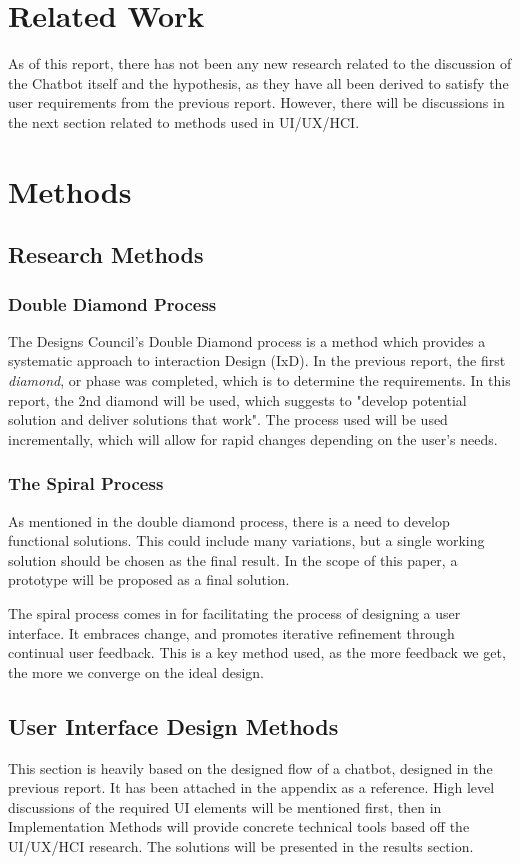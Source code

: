 \documentclass[conference]{IEEEtran}
\begin{document}
\section{Related Work}
As of this report, there has not been any new research related to the discussion of the Chatbot itself and the hypothesis, as they have all been derived to satisfy the user requirements from the previous report. However, there will be discussions in the next section related to methods used in UI/UX/HCI.
\section{Methods}
\subsection{Research Methods}
\subsubsection{Double Diamond Process}
The Designs Council’s Double Diamond process is a method which provides a systematic approach to interaction Design (IxD). In the previous report, the first \textit{diamond}, or phase was completed, which is to determine the requirements. In this report, the 2nd diamond will be used, which suggests to "develop potential solution and deliver solutions that work". The process used will be used incrementally, which will allow for rapid changes depending on the user's needs.
\subsubsection{The Spiral Process}
As mentioned in the double diamond process, there is a need to develop functional solutions. This could include many variations, but a single working solution should be chosen as the final result. In the scope of this paper, a prototype will be proposed as a final solution. 

The spiral process comes in for facilitating the process of designing a user interface. It embraces change, and promotes iterative refinement through continual user feedback. This is a key method used, as the more feedback we get, the more we converge on the ideal design.
\subsection{User Interface Design Methods}
This section is heavily based on the designed flow of a chatbot, designed in the previous report. It has been attached in the appendix as a reference. High level discussions of the required UI elements will be mentioned first, then in Implementation Methods will provide concrete technical tools based off the UI/UX/HCI research. The solutions will be presented in the results section.
\end{document}
